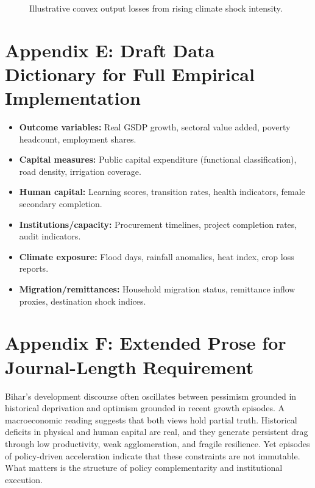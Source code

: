\documentclass[preprint,12pt]{elsarticle}
\begin{document}
\begin{figure}[H]
\centering
{}
\caption{Illustrative convex output losses from rising climate shock intensity.}
\label{fig:climate}
\end{figure}

\section{Appendix E: Draft Data Dictionary for Full Empirical Implementation}
\begin{itemize}
\item \textbf{Outcome variables:} Real GSDP growth, sectoral value added, poverty headcount, employment shares.
\item \textbf{Capital measures:} Public capital expenditure (functional classification), road density, irrigation coverage.
\item \textbf{Human capital:} Learning scores, transition rates, health indicators, female secondary completion.
\item \textbf{Institutions/capacity:} Procurement timelines, project completion rates, audit indicators.
\item \textbf{Climate exposure:} Flood days, rainfall anomalies, heat index, crop loss reports.
\item \textbf{Migration/remittances:} Household migration status, remittance inflow proxies, destination shock indices.
\end{itemize}

\section{Appendix F: Extended Prose for Journal-Length Requirement}
Bihar's development discourse often oscillates between pessimism grounded in historical deprivation and optimism grounded in recent growth episodes. A macroeconomic reading suggests that both views hold partial truth. Historical deficits in physical and human capital are real, and they generate persistent drag through low productivity, weak agglomeration, and fragile resilience. Yet episodes of policy-driven acceleration indicate that these constraints are not immutable. What matters is the structure of policy complementarity and institutional execution.
\end{document}

